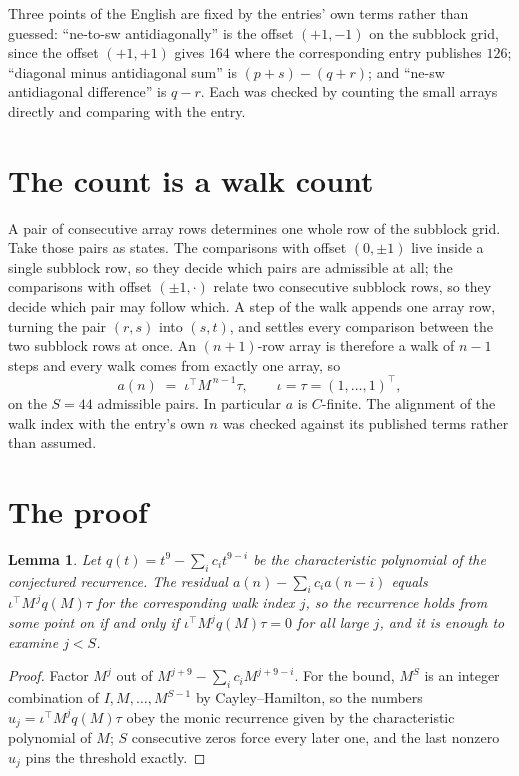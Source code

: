 \documentclass[11pt,a4paper]{article}
\theoremstyle{plain}
\newtheorem{lemma}[theorem]{Lemma}
\theoremstyle{definition}
\begin{document}
Three points of the English are fixed by the entries' own terms rather than guessed:
``ne-to-sw antidiagonally'' is the offset $(+1,-1)$ on the subblock grid, since the offset
$(+1,+1)$ gives $164$ where the corresponding entry publishes $126$; ``diagonal minus
antidiagonal sum'' is $(p+s)-(q+r)$; and ``ne-sw antidiagonal difference'' is $q-r$. Each was
checked by counting the small arrays directly and comparing with the entry.

\section{The count is a walk count}

A pair of consecutive array rows determines one whole row of the subblock grid. Take those
pairs as states. The comparisons with offset $(0,\pm1)$ live inside a single subblock row, so
they decide which pairs are admissible at all; the comparisons with offset $(\pm1,\cdot)$
relate two consecutive subblock rows, so they decide which pair may follow which. A step of the
walk appends one array row, turning the pair $(r,s)$ into $(s,t)$, and settles every comparison
between the two subblock rows at once. An $(n+1)$-row array is therefore a walk of $n-1$ steps
and every walk comes from exactly one array, so
\[
a(n)\;=\;\iota^{\!\top}M^{\,n-1}\tau,\qquad \iota=\tau=(1,\dots,1)^{\!\top},
\]
on the $S=44$ admissible pairs. In particular $a$ is $C$-finite. The alignment of the walk
index with the entry's own $n$ was checked against its published terms rather than assumed.

\section{The proof}

\begin{lemma}\label{lem:crit}
Let $q(t)=t^{9}-\sum_i c_it^{9-i}$ be the characteristic polynomial of the
conjectured recurrence. The residual $a(n)-\sum_ic_ia(n-i)$ equals
$\iota^{\!\top}M^{\,j}q(M)\tau$ for the corresponding walk index $j$, so the recurrence
holds from some point on if and only if $\iota^{\!\top}M^{j}q(M)\tau=0$ for all large $j$,
and it is enough to examine $j<S$.
\end{lemma}

\begin{proof}
Factor $M^{j}$ out of $M^{j+9}-\sum_ic_iM^{j+9-i}$. For the bound, $M^{S}$
is an integer combination of $I,M,\dots,M^{S-1}$ by Cayley--Hamilton, so the numbers
$u_j=\iota^{\!\top}M^{j}q(M)\tau$ obey the monic recurrence given by the characteristic
polynomial of $M$; $S$ consecutive zeros force every later one, and the last nonzero $u_j$
pins the threshold exactly.
\end{proof}
\end{document}
